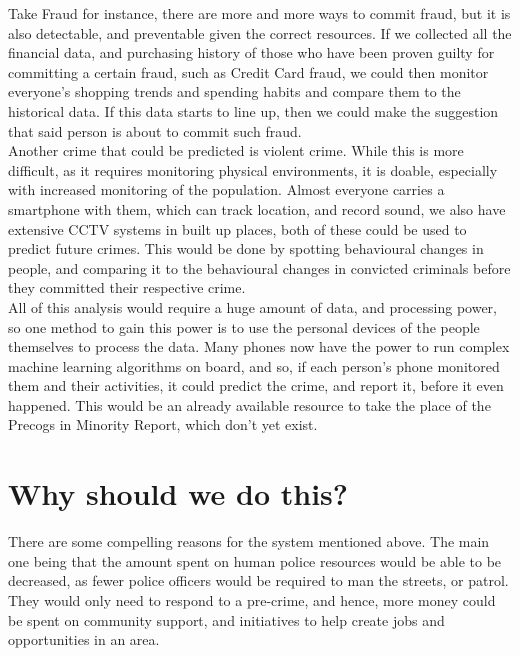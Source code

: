 \documentclass[12pt]{amsart}
\begin{document}
    Take Fraud for instance, there are more and more ways to commit fraud, but it is also detectable, and preventable
    given the correct resources.
    If we collected all the financial data, and purchasing history of those who have been proven guilty for
    committing a certain fraud, such as Credit Card fraud, we could then monitor everyone's shopping trends and spending
    habits and compare them to the historical data.
    If this data starts to line up, then we could make the suggestion that said person is about to commit such fraud.
    \\

    Another crime that could be predicted is violent crime.
    While this is more difficult, as it requires monitoring physical environments, it is doable, especially with
    increased monitoring of the population.
    Almost everyone carries a smartphone with them, which can track location, and record sound, we also have extensive
    CCTV systems in built up places, both of these could be used to predict future crimes.
    This would be done by spotting behavioural changes in people, and comparing it to the behavioural changes in
    convicted criminals before they committed their respective crime.
    \\

    All of this analysis would require a huge amount of data, and processing power, so one method to gain this power
    is to use the personal devices of the people themselves to process the data.
    Many phones now have the power to run complex machine learning algorithms on board, and so, if each person's phone
    monitored them and their activities, it could predict the crime, and report it, before it even happened.
    This would be an already available resource to take the place of the Precogs in Minority Report, which don't yet
    exist.

    \section{Why should we do this?}\label{sec:why-should-we-do-this?}  %

    There are some compelling reasons for the system mentioned above.
    The main one being that the amount spent on human police resources would be able to be decreased, as fewer
    police officers would be required to man the streets, or patrol.
    They would only need to respond to a pre-crime, and hence, more money could be spent on community support, and
    initiatives to help create jobs and opportunities in an area.
    \\
\end{document}
